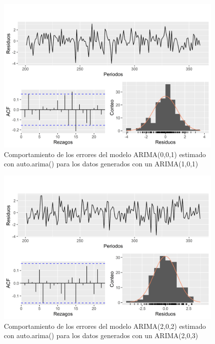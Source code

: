 \documentclass[
]{article}
\begin{document}
\begin{figure}[H]
\includegraphics[width=1\linewidth,height=1\textheight]{Tesis_files/figure-latex/errores_simulados_autoarima2-1} \caption{Comportamiento de los errores del modelo ARIMA(0,0,1) estimado con auto.arima() para los datos generados con un ARIMA(1,0,1)}\label{fig:errores_simulados_autoarima2}
\end{figure}

\begin{figure}[H]
\includegraphics[width=1\linewidth,height=1\textheight]{Tesis_files/figure-latex/errores_simulados_autoarima3-1} \caption{Comportamiento de los errores del modelo ARIMA(2,0,2) estimado con auto.arima() para los datos generados con un ARIMA(2,0,3)}\label{fig:errores_simulados_autoarima3}
\end{figure}
\end{document}
